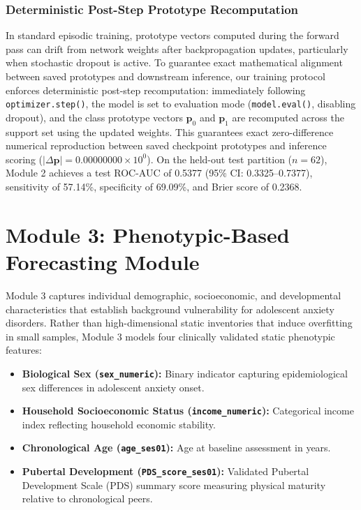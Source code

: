 \documentclass[10pt,letterpaper]{article}
\begin{document}
        \subsubsection*{\textbf{Deterministic Post-Step Prototype Recomputation}}
        In standard episodic training, prototype vectors computed during the forward pass can drift from network weights after backpropagation updates, particularly when stochastic dropout is active. To guarantee exact mathematical alignment between saved prototypes and downstream inference, our training protocol enforces deterministic post-step recomputation: immediately following \texttt{optimizer.step()}, the model is set to evaluation mode (\texttt{model.eval()}, disabling dropout), and the class prototype vectors $\mathbf{p}_0$ and $\mathbf{p}_1$ are recomputed across the support set using the updated weights. This guarantees exact zero-difference numerical reproduction between saved checkpoint prototypes and inference scoring ($|\Delta \mathbf{p}| = 0.00000000\times 10^0$). On the held-out test partition ($n=62$), Module 2 achieves a test ROC-AUC of 0.5377 (95\% CI: 0.3325--0.7377), sensitivity of 57.14\%, specificity of 69.09\%, and Brier score of 0.2368.

        \section*{Module 3: Phenotypic-Based Forecasting Module}

        Module 3 captures individual demographic, socioeconomic, and developmental characteristics that establish background vulnerability for adolescent anxiety disorders. Rather than high-dimensional static inventories that induce overfitting in small samples, Module 3 models four clinically validated static phenotypic features:
        \begin{itemize}
            \item \textbf{Biological Sex (\texttt{sex\_numeric}):} Binary indicator capturing epidemiological sex differences in adolescent anxiety onset.
            \item \textbf{Household Socioeconomic Status (\texttt{income\_numeric}):} Categorical income index reflecting household economic stability.
            \item \textbf{Chronological Age (\texttt{age\_ses01}):} Age at baseline assessment in years.
            \item \textbf{Pubertal Development (\texttt{PDS\_score\_ses01}):} Validated Pubertal Development Scale (PDS) summary score measuring physical maturity relative to chronological peers.
        \end{itemize}
\end{document}
